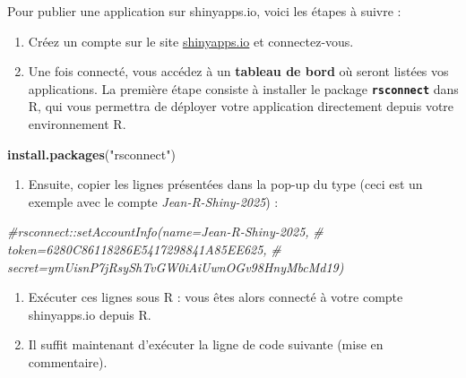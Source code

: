 \documentclass[
]{article}
\newenvironment{Shaded}{\begin{snugshade}}{\end{snugshade}}
\newcommand{\CommentTok}[1]{\textcolor[rgb]{0.56,0.35,0.01}{\textit{#1}}}
\newcommand{\FunctionTok}[1]{\textcolor[rgb]{0.13,0.29,0.53}{\textbf{#1}}}
\newcommand{\NormalTok}[1]{#1}
\newcommand{\StringTok}[1]{\textcolor[rgb]{0.31,0.60,0.02}{#1}}
\providecommand{\tightlist}{%
  \setlength{\itemsep}{0pt}\setlength{\parskip}{0pt}}
\begin{document}
Pour publier une application sur shinyapps.io, voici les étapes à suivre
:

\begin{enumerate}
\def\labelenumi{\arabic{enumi}.}
\item
  Créez un compte sur le site
  \href{https://www.shinyapps.io}{shinyapps.io} et connectez-vous.
\item
  Une fois connecté, vous accédez à un \textbf{tableau de bord} où
  seront listées vos applications. La première étape consiste à
  installer le package \textbf{\texttt{rsconnect}} dans R, qui vous
  permettra de déployer votre application directement depuis votre
  environnement R.
\end{enumerate}

\begin{Shaded}
\begin{Highlighting}[]
\FunctionTok{install.packages}\NormalTok{(}\StringTok{"rsconnect"}\NormalTok{)}
\end{Highlighting}
\end{Shaded}

\begin{enumerate}
\def\labelenumi{\arabic{enumi}.}
\setcounter{enumi}{2}
\tightlist
\item
  Ensuite, copier les lignes présentées dans la pop-up du type (ceci est
  un exemple avec le compte \emph{Jean-R-Shiny-2025}) :
\end{enumerate}

\begin{Shaded}
\begin{Highlighting}[]
\CommentTok{\#rsconnect::setAccountInfo(name=\textquotesingle{}Jean{-}R{-}Shiny{-}2025\textquotesingle{},}
                    \CommentTok{\#      token=\textquotesingle{}6280C86118286E5417298841A85EE625\textquotesingle{},}
                    \CommentTok{\#      secret=\textquotesingle{}ymUisnP7jRsyShTvGW0iAiUwnOGv98HnyMbcMd19\textquotesingle{})}
\end{Highlighting}
\end{Shaded}

\begin{enumerate}
\def\labelenumi{\arabic{enumi}.}
\setcounter{enumi}{3}
\item
  Exécuter ces lignes sous R : vous êtes alors connecté à votre compte
  shinyapps.io depuis R.
\item
  Il suffit maintenant d'exécuter la ligne de code suivante (mise en
  commentaire).
\end{enumerate}
\end{document}
